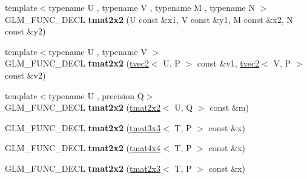 \begin{DoxyCompactItemize}
\item 
\hypertarget{structglm_1_1detail_1_1tmat2x2_adef8daef1582260e30e727f31ec58fc4}{{\footnotesize template$<$typename U , typename V , typename M , typename N $>$ }\\G\-L\-M\-\_\-\-F\-U\-N\-C\-\_\-\-D\-E\-C\-L {\bfseries tmat2x2} (U const \&x1, V const \&y1, M const \&x2, N const \&y2)}\label{structglm_1_1detail_1_1tmat2x2_adef8daef1582260e30e727f31ec58fc4}

\item 
\hypertarget{structglm_1_1detail_1_1tmat2x2_a09f5f84943ae5636f82d1483cc815ef3}{{\footnotesize template$<$typename U , typename V $>$ }\\G\-L\-M\-\_\-\-F\-U\-N\-C\-\_\-\-D\-E\-C\-L {\bfseries tmat2x2} (\hyperlink{structglm_1_1detail_1_1tvec2}{tvec2}$<$ U, P $>$ const \&v1, \hyperlink{structglm_1_1detail_1_1tvec2}{tvec2}$<$ V, P $>$ const \&v2)}\label{structglm_1_1detail_1_1tmat2x2_a09f5f84943ae5636f82d1483cc815ef3}

\item 
\hypertarget{structglm_1_1detail_1_1tmat2x2_a6a9b44f5626983a1f66171f8cecfbc8f}{{\footnotesize template$<$typename U , precision Q$>$ }\\G\-L\-M\-\_\-\-F\-U\-N\-C\-\_\-\-D\-E\-C\-L {\bfseries tmat2x2} (\hyperlink{structglm_1_1detail_1_1tmat2x2}{tmat2x2}$<$ U, Q $>$ const \&m)}\label{structglm_1_1detail_1_1tmat2x2_a6a9b44f5626983a1f66171f8cecfbc8f}

\item 
\hypertarget{structglm_1_1detail_1_1tmat2x2_a291750bdcaf39932f079105ca4dd6633}{G\-L\-M\-\_\-\-F\-U\-N\-C\-\_\-\-D\-E\-C\-L {\bfseries tmat2x2} (\hyperlink{structglm_1_1detail_1_1tmat3x3}{tmat3x3}$<$ T, P $>$ const \&x)}\label{structglm_1_1detail_1_1tmat2x2_a291750bdcaf39932f079105ca4dd6633}

\item 
\hypertarget{structglm_1_1detail_1_1tmat2x2_ad46d070d32a5455eddf99fea687b488d}{G\-L\-M\-\_\-\-F\-U\-N\-C\-\_\-\-D\-E\-C\-L {\bfseries tmat2x2} (\hyperlink{structglm_1_1detail_1_1tmat4x4}{tmat4x4}$<$ T, P $>$ const \&x)}\label{structglm_1_1detail_1_1tmat2x2_ad46d070d32a5455eddf99fea687b488d}

\item 
\hypertarget{structglm_1_1detail_1_1tmat2x2_abe06c612421c4e601074d1e66772ae6a}{G\-L\-M\-\_\-\-F\-U\-N\-C\-\_\-\-D\-E\-C\-L {\bfseries tmat2x2} (\hyperlink{structglm_1_1detail_1_1tmat2x3}{tmat2x3}$<$ T, P $>$ const \&x)}\label{structglm_1_1detail_1_1tmat2x2_abe06c612421c4e601074d1e66772ae6a}


\end{DoxyCompactItemize}
